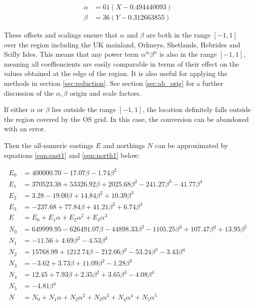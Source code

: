 \documentclass[10pt,a4paper]{article}
\begin{document}
\begin{align}
  \alpha &= 61 (X-0.494440093) \\
  \beta  &= 36 (Y-0.312663855)
\end{align}

These offsets and scalings ensure that $\alpha$ and $\beta$ are both in the
range $[-1,1]$ over the region including the UK mainland, Orkneys, Shetlands,
Hebrides and Scilly Isles.  This means that any power term $\alpha^m \beta^n$
is also in the range $[-1,1]$, meaning all coeffiencients are easily comparable
in terms of their effect on the values obtained at the edge of the region.  It
is also useful for applying the methods in section \ref{sec:reduction}.  See
section \ref{sec:ab_orig} for a further discussion of the $\alpha,\beta$ origin
and scale factors.

If either $\alpha$ or $\beta$ lies outside the range $[-1,1]$, the location
definitely falls outside the region covered by the OS grid.  In this case, the
conversion can be abandoned with an error.

Then the all-numeric eastings $E$ and northings $N$ can be approximated by
equations \eqref{eqn:east1} and \eqref{eqn:north1} below:

\begin{align}
E_0 &= 400000.70 -17.07\beta -1.74\beta^2\nonumber \\
E_1 &= 370523.38 +53326.92\beta +2025.68\beta^2 -241.27\beta^3 -41.77\beta^4\nonumber \\
E_2 &= 3.28 -19.00\beta +14.84\beta^2 +10.39\beta^3\nonumber \\
E_3 &= -237.68 +77.84\beta +41.21\beta^2 +6.74\beta^3\nonumber \\
E &= E_0 +E_1\alpha +E_2\alpha^2 +E_3\alpha^3
  \label{eqn:east1}
\\[2ex]
N_0 &= 649999.95 -626491.07\beta -44898.33\beta^2 -1105.25\beta^3 +107.47\beta^4 +13.95\beta^5\nonumber \\
N_1 &= -11.56 +4.69\beta^2 -4.53\beta^3\nonumber \\
N_2 &= 15768.99 +1212.74\beta -212.06\beta^2 -53.24\beta^3 -3.43\beta^4\nonumber \\
N_3 &= -3.62 +3.73\beta +11.09\beta^2 -1.28\beta^3\nonumber \\
N_4 &= 12.45 +7.93\beta +2.35\beta^2 +3.65\beta^3 -4.08\beta^4\nonumber \\
N_5 &= -4.81\beta^4\nonumber \\
N &= N_0 +N_1\alpha +N_2\alpha^2 +N_3\alpha^3 +N_4\alpha^4 +N_5\alpha^5
  \label{eqn:north1}
\end{align}
\end{document}
